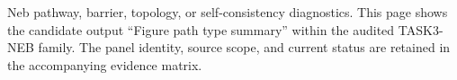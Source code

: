 Neb pathway, barrier, topology, or self-consistency diagnostics. This page shows the candidate output ``Figure path type summary'' within the audited TASK3-NEB family. The panel identity, source scope, and current status are retained in the accompanying evidence matrix.
